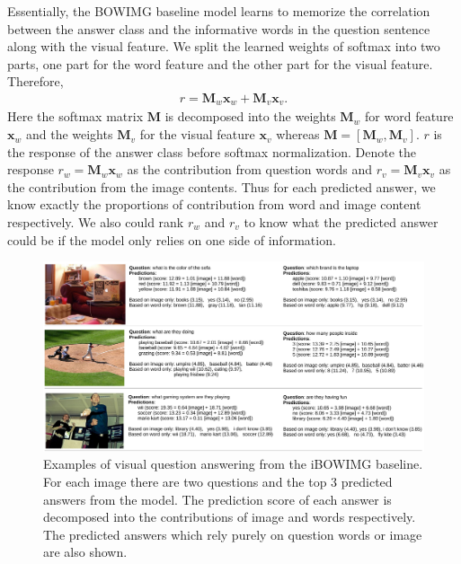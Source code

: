 \documentclass{article} %
\begin{document}
Essentially, the BOWIMG baseline model learns to memorize the correlation between the answer class and the informative words in the question sentence along with the visual feature. We split the learned weights of softmax into two parts, one part for the word feature and the other part for the visual feature. Therefore, 
\begin{align}\label{eq:linearscore}
r = \textbf{M}_{w}\textbf{x}_{w} + \textbf{M}_{v}\textbf{x}_{v}.
\end{align}
Here the softmax matrix $\textbf{M}$ is decomposed into the weights $\textbf{M}_w$ for word feature $\textbf{x}_{w}$ and the weights $\textbf{M}_v$ for the visual feature $\textbf{x}_{v}$ whereas $\textbf{M} = [\textbf{M}_w,\textbf{M}_v]$. $r$ is the response of the answer class before softmax normalization. Denote the response $r_w = \textbf{M}_{w}\textbf{x}_{w}$ as the contribution from question words and $r_v = \textbf{M}_{v}\textbf{x}_{v}$ as the contribution from the image contents. Thus for each predicted answer, we know exactly the proportions of contribution from word and image content respectively. We also could rank $r_w$ and $r_v$ to know what the predicted answer could be if the model only relies on one side of information. 

\begin{figure}
\begin{center}
\includegraphics[width=1\linewidth]{result.pdf}
\end{center}
\caption{Examples of visual question answering from the iBOWIMG baseline. For each image there are two questions and the top 3 predicted answers from the model. The prediction score of each answer is decomposed into the contributions of image and words respectively. The predicted answers which rely purely on question words or image are also shown.}\label{vqa_prediction}
\end{figure}
\end{document}
